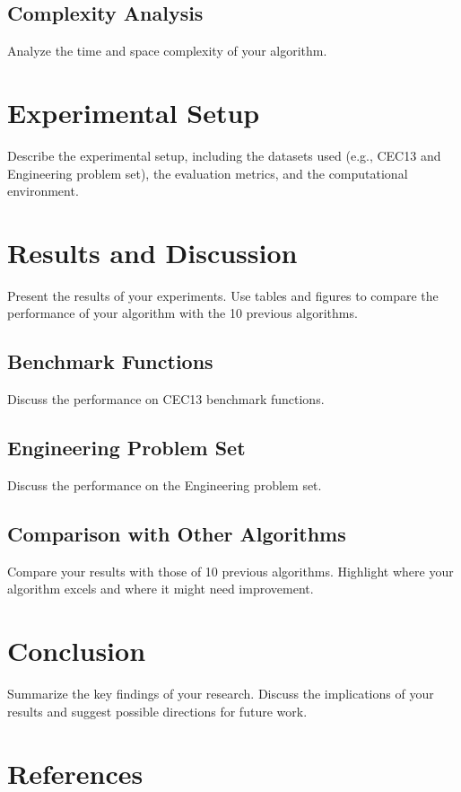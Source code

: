 \documentclass[twocolumn]{elsarticle}
\begin{document}
\subsection{Complexity Analysis}
Analyze the time and space complexity of your algorithm.

\section{Experimental Setup}
\label{sec:setup}
Describe the experimental setup, including the datasets used (e.g., CEC13 and Engineering problem set), the evaluation metrics, and the computational environment.

\section{Results and Discussion}
\label{sec:results}
Present the results of your experiments. Use tables and figures to compare the performance of your algorithm with the 10 previous algorithms.

\subsection{Benchmark Functions}
Discuss the performance on CEC13 benchmark functions.

\subsection{Engineering Problem Set}
Discuss the performance on the Engineering problem set.

\subsection{Comparison with Other Algorithms}
Compare your results with those of 10 previous algorithms. Highlight where your algorithm excels and where it might need improvement.

\section{Conclusion}
\label{sec:conclusion}
Summarize the key findings of your research. Discuss the implications of your results and suggest possible directions for future work.

\section*{References}


\end{document}
